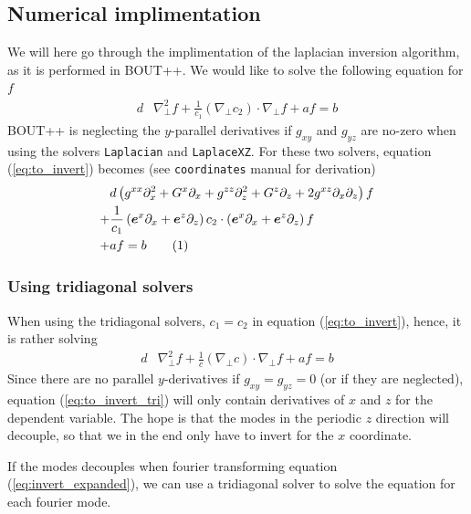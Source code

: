 \documentclass[12pt]{article}
\def\L{\left}
\def\R{\right}
\newcommand{\ve}[1]{\ensuremath{\boldsymbol{#1}}}
\newcommand\numberthis{\addtocounter{equation}{1}\tag{\theequation}}
\begin{document}
\subsection{Numerical implimentation}
%
\label{sec:num_laplace}
%
We will here go through the implimentation of the laplacian inversion
algorithm, as it is performed in BOUT++. We would like to solve the following
equation for $f$
%
\begin{align}
    d&\nabla_\perp^2f + \frac{1}{c_1}(\nabla_\perp c_2)\cdot\nabla_\perp f + af
    = b
%
\label{eq:to_invert}
%
\end{align}
%
BOUT++ is neglecting the $y$-parallel derivatives if $g_{xy}$ and $g_{yz}$ are
no-zero when using the solvers \texttt{Laplacian} and \texttt{LaplaceXZ}.  For
these two solvers, equation (\ref{eq:to_invert}) becomes (see
\texttt{coordinates} manual for derivation)
%
\begin{align*}
    \, &d \L(    g^{xx} \partial_x^2 + G^x \partial_x + g^{zz} \partial_z^2 +
    G^z \partial_z + 2g^{xz} \partial_x \partial_z \R) f \\
%
    +& \frac{1}{c_1}\L( \ve{e}^x \partial_x +  \ve{e}^z \partial_z \R) c_2
    \cdot \L( \ve{e}^x \partial_x +  \ve{e}^z \partial_z \R) f \\
%
    +& af = b \numberthis
%
\label{eq:invert_expanded}
%
\end{align*}
%


\subsubsection{Using tridiagonal solvers}
%
When using the tridiagonal solvers, $c_1 = c_2$ in equation
(\ref{eq:to_invert}), hence, it is rather solving
%
\begin{align}
    d&\nabla_\perp^2f + \frac{1}{c}(\nabla_\perp c)\cdot\nabla_\perp f + af = b
%
\label{eq:to_invert_tri}
%
\end{align}
%
Since there are no parallel $y$-derivatives if $g_{xy}=g_{yz}=0$ (or if they
are neglected), equation (\ref{eq:to_invert_tri}) will only contain derivatives
of $x$ and $z$ for the dependent variable. The hope is that the modes in the
periodic $z$ direction will decouple, so that we in the end only have to invert
for the $x$ coordinate.

If the modes decouples when fourier transforming equation
(\ref{eq:invert_expanded}), we can use a tridiagonal solver to solve the
equation for each fourier mode.
\end{document}
